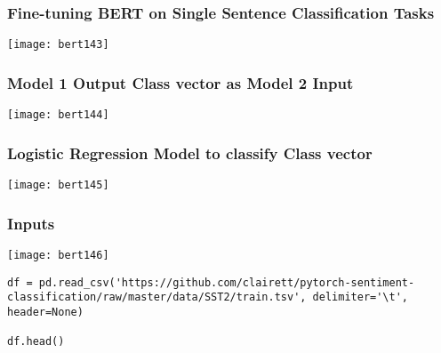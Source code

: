 \begin{frame}[fragile]\frametitle{ Fine-tuning BERT on Single Sentence Classification Tasks}

			\begin{center}
			\texttt{[image: bert143]}
			\end{center}	


\end{frame}

\begin{frame}[fragile]\frametitle{ Model 1 Output Class vector as Model 2 Input}

			\begin{center}
			\texttt{[image: bert144]}
			\end{center}	


\end{frame}

\begin{frame}[fragile]\frametitle{ Logistic Regression Model to classify Class vector }

			\begin{center}
			\texttt{[image: bert145]}
			\end{center}	


\end{frame}

\begin{frame}[fragile]\frametitle{Inputs}



			\begin{center}
			\texttt{[image: bert146]}
			\end{center}	

\begin{lstlisting}
df = pd.read_csv('https://github.com/clairett/pytorch-sentiment-classification/raw/master/data/SST2/train.tsv', delimiter='\t', header=None)

df.head()
\end{lstlisting}


\end{frame}

